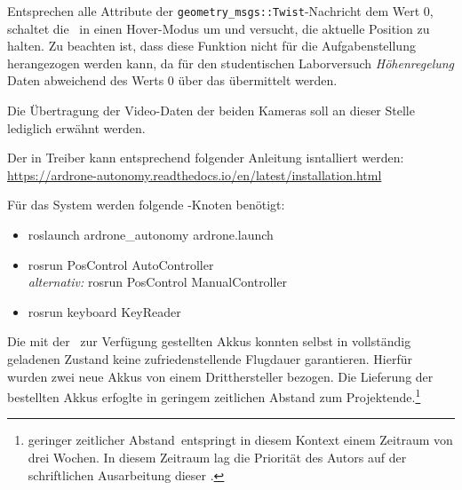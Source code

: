Entsprechen alle Attribute der \texttt{geometry\_msgs::Twist}-Nachricht dem Wert 0, schaltet die \Ar\ in einen Hover-Modus um und versucht, die aktuelle Position zu halten. Zu beachten ist, dass diese Funktion nicht für die Aufgabenstellung herangezogen werden kann, da für den studentischen Laborversuch \textit{Höhenregelung} Daten abweichend des Werts 0 über das  übermittelt werden.


Die Übertragung der Video-Daten der beiden Kameras soll an dieser Stelle lediglich erwähnt werden.




















Der in  Treiber kann entsprechend folgender Anleitung isntalliert werden:\\
\href{https://ardrone-autonomy.readthedocs.io/en/latest/installation.html}{https://ardrone-autonomy.readthedocs.io/en/latest/installation.html}

Für das System werden folgende \ROS-Knoten benötigt:
\begin{itemize}
\item roslaunch ardrone\_autonomy ardrone.launch
\item rosrun PosControl AutoController\\
\textit{alternativ:} rosrun PosControl ManualController
\item rosrun keyboard KeyReader
\end{itemize}



Die mit der \Ar\ zur Verfügung gestellten Akkus konnten selbst in vollständig geladenen Zustand keine zufriedenstellende Flugdauer garantieren. Hierfür wurden zwei neue Akkus von einem Dritthersteller bezogen. Die Lieferung der bestellten Akkus erfoglte in geringem zeitlichen Abstand zum Projektende.\footnote{\glqq geringer zeitlicher Abstand\grqq\ entspringt in diesem Kontext einem Zeitraum von drei Wochen. In diesem Zeitraum lag die Priorität des Autors auf der schriftlichen Ausarbeitung dieser \Arbeit.}




















